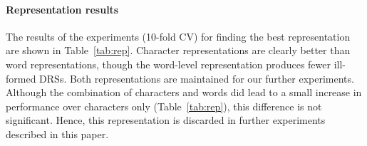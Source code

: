 \documentclass[11pt,a4paper]{article}
\begin{document}
\paragraph{Representation results}

The results of the experiments (10-fold CV) for finding the best representation are shown in Table~\ref{tab:rep}. Character representations are clearly better than word representations, though the word-level representation produces fewer ill-formed DRSs. Both representations are maintained for our further experiments. 
Although the combination of characters and words did lead to a small increase in performance over characters only (Table~\ref{tab:rep}), this difference is not significant. Hence, this representation is discarded in further experiments described in this paper.

\begin{table}[!htb]
\centering
{}
\caption{Evaluating different input representations. 
The percentage of ill-formed DRSs is denoted by  \%\,ill.}
\label{tab:rep}
\end{table}
\end{document}
